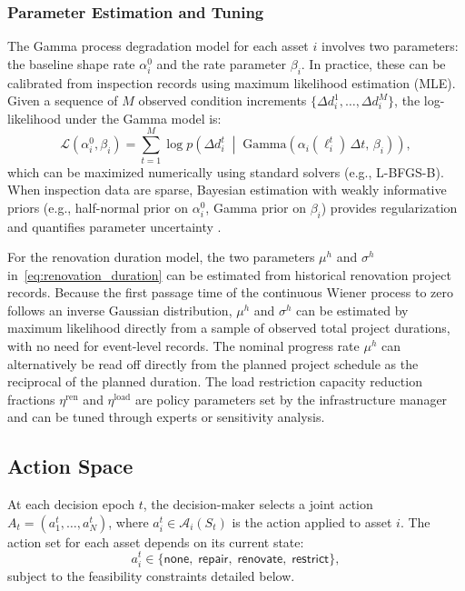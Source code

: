 \documentclass[3p, twocolumn]{elsarticle}
\begin{document}
\subsubsection{Parameter Estimation and Tuning}

The Gamma process degradation model for each asset $i$ involves two parameters: the baseline shape rate $\alpha_i^0$ and the rate parameter $\beta_i$. In practice, these can be calibrated from inspection records using maximum likelihood estimation (MLE). Given a sequence of $M$ observed condition increments $\{\Delta d_i^1, \ldots, \Delta d_i^M\}$, the log-likelihood under the Gamma model is:
\begin{equation}
    \mathcal{L}(\alpha_i^0, \beta_i) = \sum_{t=1}^{M} \log p\!\left(\Delta d_i^t \;\middle|\; \mathrm{Gamma}\!\left(\alpha_i(\ell_i^t)\,\Delta t,\, \beta_i\right)\right),
\end{equation}
which can be maximized numerically using standard solvers (e.g., L-BFGS-B). When inspection data are sparse, Bayesian estimation with weakly informative priors (e.g., half-normal prior on $\alpha_i^0$, Gamma prior on $\beta_i$) provides regularization and quantifies parameter uncertainty \citep{van_noortwijk_survey_2009}.

For the renovation duration model, the two parameters $\mu^h$ and $\sigma^h$ in~\eqref{eq:renovation_duration} can be estimated from historical renovation project records. Because the first passage time of the continuous Wiener process to zero follows an inverse Gaussian distribution, $\mu^h$ and $\sigma^h$ can be estimated by maximum likelihood directly from a sample of observed total project durations, with no need for event-level records. The nominal progress rate $\mu^h$ can alternatively be read off directly from the planned project schedule as the reciprocal of the planned duration. The load restriction capacity reduction fractions $\eta^{\text{ren}}$ and $\eta^{\text{load}}$ are policy parameters set by the infrastructure manager and can be tuned through experts or sensitivity analysis.

\subsection{Action Space}
\label{subsec:actions}

At each decision epoch $t$, the decision-maker selects a joint action $A_t = (a_1^t, \ldots, a_N^t)$, where $a_i^t \in \mathcal{A}_i(S_t)$ is the action applied to asset $i$. The action set for each asset depends on its current state:
\begin{equation}
    a_i^t \in \{\textsf{none},\; \textsf{repair},\; \textsf{renovate},\; \textsf{restrict}\},
    \label{eq:actions}
\end{equation}
subject to the feasibility constraints detailed below. 
\end{document}
